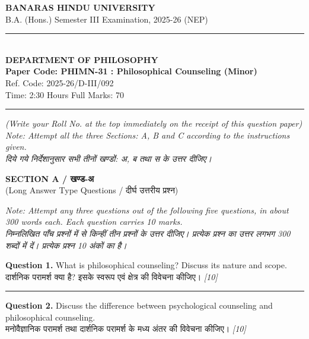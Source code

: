 \documentclass[11pt,a4paper]{article}
\newcommand{\pts}[1]{\hfill \textit{[#1]}}
\begin{document}
\begin{center}
  {\large\bfseries BANARAS HINDU UNIVERSITY}\\[2pt]
  {\normalsize B.A. (Hons.) Semester III Examination, 2025-26 (NEP)}\\[6pt]
  \rule{0.8\linewidth}{0.5pt}\\[6pt]
  {\large\bfseries DEPARTMENT OF PHILOSOPHY}\\[4pt]
  {\large\bfseries Paper Code: PHIMN-31 : Philosophical Counseling (Minor)}\\[2pt]
  {\small Ref. Code: 2025-26/D-III/092}\\[4pt]
  {\normalsize Time: 2:30 Hours \hfill Full Marks: 70}
\end{center}

\rule{\linewidth}{0.4pt}

\smallskip

\noindent \textit{(Write your Roll No. at the top immediately on the receipt of this question paper)}\\[2pt]
\noindent \textit{Note: Attempt all the three Sections: A, B and C according to the instructions given.}\\[1pt]
\noindent \textit{दिये गये निर्देशानुसार सभी तीनों खण्डों: अ, ब तथा स के उत्तर दीजिए।}

\bigskip

\begin{center}
  {\large\bfseries SECTION A / खण्ड-अ}\\[2pt]
  {\normalsize (Long Answer Type Questions / दीर्घ उत्तरीय प्रश्न)}
\end{center}

\noindent \textit{Note: Attempt any three questions out of the following five questions, in about 300 words each. Each question carries 10 marks.}\\[2pt]
\noindent \textit{निम्नलिखित पाँच प्रश्नों में से किन्हीं तीन प्रश्नों के उत्तर दीजिए। प्रत्येक प्रश्न का उत्तर लगभग 300 शब्दों में दें। प्रत्येक प्रश्न 10 अंकों का है।}

\bigskip

\noindent \textbf{Question 1.} What is philosophical counseling? Discuss its nature and scope.\\[1pt]
दार्शनिक परामर्श क्या है? इसके स्वरूप एवं क्षेत्र की विवेचना कीजिए। \pts{10}

\medskip\rule{\linewidth}{0.2pt}\medskip

\noindent \textbf{Question 2.} Discuss the difference between psychological counseling and philosophical counseling.\\[1pt]
मनोवैज्ञानिक परामर्श तथा दार्शनिक परामर्श के मध्य अंतर की विवेचना कीजिए। \pts{10}
\end{document}
